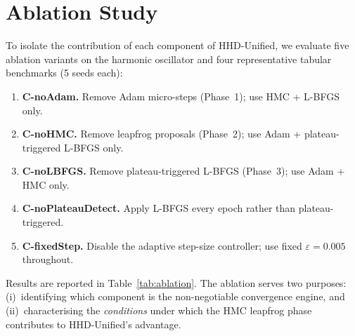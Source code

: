 \documentclass[11pt]{article}
\theoremstyle{definition}
\begin{document}

\section{Ablation Study}
\label{sec:ablation}

To isolate the contribution of each component of HHD-Unified, we
evaluate five ablation variants on the harmonic oscillator and four
representative tabular benchmarks (5 seeds each):

\begin{enumerate}[label=\textbf{Abl-\arabic*.},leftmargin=*]

  \item \textbf{C-noAdam.} Remove Adam micro-steps (Phase~1); use
        HMC + L-BFGS only.

  \item \textbf{C-noHMC.} Remove leapfrog proposals (Phase~2); use
        Adam + plateau-triggered L-BFGS only.

  \item \textbf{C-noLBFGS.} Remove plateau-triggered L-BFGS
        (Phase~3); use Adam + HMC only.

  \item \textbf{C-noPlateauDetect.} Apply L-BFGS every epoch rather
        than plateau-triggered.

  \item \textbf{C-fixedStep.} Disable the adaptive step-size
        controller; use fixed $\varepsilon=0.005$ throughout.

\end{enumerate}

Results are reported in Table~\ref{tab:ablation}.  The ablation
serves two purposes: (i)~identifying which component is the
non-negotiable convergence engine, and (ii)~characterising the
\emph{conditions} under which the HMC leapfrog phase contributes
to HHD-Unified's advantage.
\end{document}

